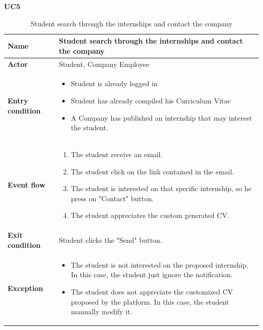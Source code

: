     \textbf{UC5}
    \nopagebreak
    \begin{table}[H]
    \centering
    \begin{tabular}{|l|p{11.9cm}|}
        \hline
        \textbf{Name}            & Student search through the internships and contact the company \\\hline
        \textbf{Actor}           & Student, Company Employee         \\\hline
        \textbf{Entry condition} &
        \begin{itemize}
              \item Student is already logged in
              \item Student has already compiled his Curriculum Vitae
              \item A Company has published an internship that may interest the student.
        \end{itemize}                                        \\\hline
        \textbf{Event flow}      &
        \begin{enumerate}[label=\arabic*.]
              \item The student receive an email.
              \item The student click on the link contained in the email.
              \item The student is interested on that specific internship, so he press on "Contact" button.
              \item The student appreciates the custom generated CV.
        \end{enumerate}            \\\hline
        \textbf{Exit condition}  & Student clicks the "Send" button.\\\hline
        \textbf{Exception}       &  
        \begin{itemize}
            \item The student is not interested on the proposed internship. In this case, the student just ignore the notification.
            \item The student does not appreciate the customized CV proposed by the platform. In this case, the student manually modify it.
        \end{itemize} 
        \\\hline
    \end{tabular}
    \caption{Student search through the internships and contact the company}
    \label{table:Student search through the internhisps and contact the company}
    \end{table}
